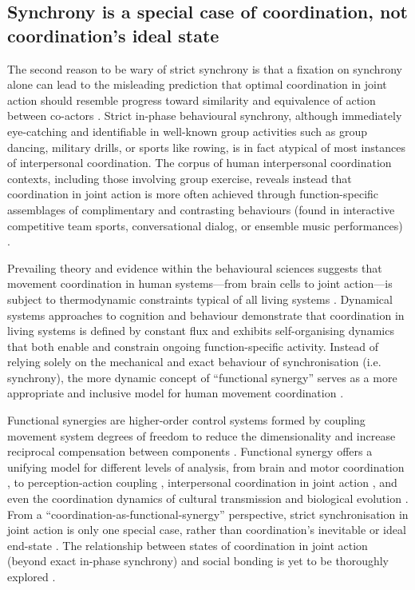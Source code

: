 \begin{CJK}{UTF8}{gbsn}
\subsection{Synchrony is a special case of coordination, not coordination's ideal state}
The second reason to be wary of strict synchrony is that a fixation on synchrony alone can lead to the misleading prediction that optimal coordination in joint action should resemble progress toward similarity and equivalence of action between co-actors \citep{Fusaroli2014}.  Strict in-phase behavioural synchrony, although immediately eye-catching and identifiable in well-known group activities such as group dancing, military drills, or sports like rowing, is in fact atypical of most instances of interpersonal coordination.  The corpus of human interpersonal coordination contexts, including those involving group exercise, reveals instead that coordination in joint action is more often achieved through function-specific assemblages of complimentary and contrasting behaviours (found in interactive competitive team sports, conversational dialog, or ensemble music performances) \citep{Novembre2014}.

Prevailing theory and evidence within the behavioural sciences suggests that movement coordination in human systems---from brain cells to joint action---is subject to thermodynamic constraints typical of all living systems \citep{Turvey1978,Yufik2013}.  Dynamical systems approaches to cognition and behaviour demonstrate that coordination in living systems is defined by constant flux and exhibits self-organising dynamics that both enable and constrain ongoing function-specific activity. Instead of relying solely on the mechanical and exact behaviour of synchronisation (i.e. synchrony), the more dynamic concept of ``functional synergy'' \citep{Turvey1990} serves as a more appropriate and inclusive model for human movement coordination \citep{Fusaroli2014}.

Functional synergies are higher-order control systems formed by coupling movement system degrees of freedom to reduce the dimensionality and increase reciprocal compensation between components \citep{Turvey1978}.  Functional synergy offers a unifying model for different levels of analysis, from brain \citep{Yufik2013} and motor coordination \citep{Latash2007}, to perception-action coupling \citep{Kelso2009}, interpersonal coordination in joint action \citep{Riley2011,Schmidt1990}, and even the coordination dynamics of cultural transmission \citep{Claidiere2007} and biological evolution \citep{Laland2015}.  From a ``coordination-as-functional-synergy'' perspective, strict synchronisation in joint action is only one special case, rather than coordination's inevitable or ideal end-state \citep[][pg. 128; Richardson, personal communication]{Kelso2013}.  The relationship between states of coordination in joint action (beyond exact in-phase synchrony) and social bonding is yet to be thoroughly explored \citep[but for a preliminary approach, see][]{Marsh2009}.


\end{CJK}
